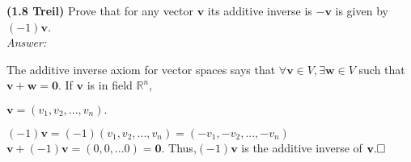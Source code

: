 \documentclass{book}
\renewcommand{\vec}[1]{\mathbf{#1}}
\begin{document}
	
	\noindent\textbf{(1.8 Treil)}
	Prove that for any vector $\vec{v}$ its additive inverse is $-\vec{v}$ is given by $(-1)\vec{v}$.
	\\\textit{Answer:}
	
	The additive inverse axiom for vector spaces says that $\forall \vec{v} \in V, \exists \vec{w} \in V$ such that $\vec{v}+\vec{w}=\vec{0}.$
	If $\vec{v}$ is in field $\mathbb{R}^n$,
	
	$\vec{v}=(v_1,v_2,...,v_n).$
	  
	$(-1)\vec{v}=(-1)(v_1,v_2,...,v_n)=(-v_1,-v_2,...,-v_n)$
	$\vec{v}+(-1)\vec{v}=(0,0,...0)=\vec{0}$.
	Thus,$(-1)\vec{v}$ is the additive inverse of $\vec{v}.\\
	\square$\\\\
	
		
	
	
\end{document}
